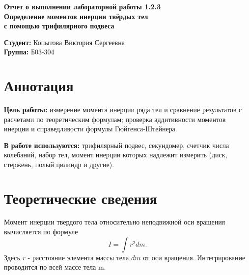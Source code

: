 \documentclass[a4paper,12pt]{article}
\begin{document}
    \begin{titlepage}
    \begin{center}
        \vspace{4cm}
        \huge {\textbf{Отчет о выполнении лабораторной работы 1.2.3}} \\
        \vspace{1cm}
        \Large {\textbf{Определение моментов инерции твёрдых тел}} \\
        \Large {\textbf{с помощью трифилярного подвеса}} \\
        \vspace{10cm}
        \begin{flushright}
        \begin{minipage}{.45\textwidth}
        \normalsize{\textbf{Студент:} Копытова Виктория Сергеевна}\\
        \textbf{Группа:} Б03-304\\
        \end{minipage}
        \end{flushright}   
    \end{center}
    \end{titlepage}
\newpage
 
\section{Аннотация}
\paragraph{}\textbf{Цель работы:} измерение момента инерции ряда тел и сравнение результатов с расчетами по теоретическим формулам; проверка аддитивности моментов инерции и справедливости формулы Гюйгенса-Штейнера.
	
\textbf{В работе используются:} трифилярный подвес, секундомер, счетчик числа колебаний, набор тел, момент инерции которых надлежит измерить (диск, стержень, полый цилиндр и другие).

\section{Теоретические сведения}
\paragraph{}Момент инерции твердого тела относительно неподвижной оси вращения вычисляется по формуле
\begin{equation}
    I = \int r^2 dm.
\end{equation}
Здесь $r$ - расстояние элемента массы тела $dm$ от оси вращения. Интегрирование проводится по всей массе тела m.
\end{document}
